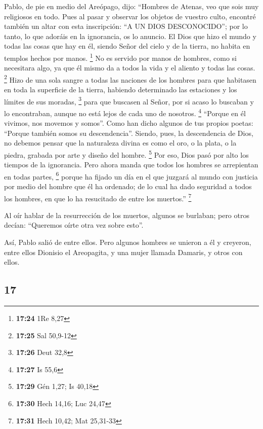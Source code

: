 \begin{paracol}{2}
 Pablo, de pie en medio del Areópago, dijo: ``Hombres de
Atenas, veo que sois muy religiosos en todo.  Pues al
pasar y observar los objetos de vuestro culto, encontré también un altar
con esta inscripción: ``A UN DIOS DESCONOCIDO''; por lo tanto, lo que
adoráis en la ignorancia, os lo anuncio.  El Dios que
hizo el mundo y todas las cosas que hay en él, siendo Señor del cielo y
de la tierra, no habita en templos hechos por manos. \footnote{\textbf{17:24}
  1Re 8,27}  No es servido por manos de hombres, como si
necesitara algo, ya que él mismo da a todos la vida y el aliento y todas
las cosas. \footnote{\textbf{17:25} Sal 50,9-12}  Hizo de
una sola sangre a todas las naciones de los hombres para que habitasen
en toda la superficie de la tierra, habiendo determinado las estaciones
y los límites de sus moradas, \footnote{\textbf{17:26} Deut 32,8}
 para que buscasen al Señor, por si acaso lo buscaban y
lo encontraban, aunque no está lejos de cada uno de nosotros.
\footnote{\textbf{17:27} Is 55,6}  ``Porque en él
vivimos, nos movemos y somos''. Como han dicho algunos de tus propios
poetas: ``Porque también somos su descendencia''. 
Siendo, pues, la descendencia de Dios, no debemos pensar que la
naturaleza divina es como el oro, o la plata, o la piedra, grabada por
arte y diseño del hombre. \footnote{\textbf{17:29} Gén 1,27; Is 40,18}
 Por eso, Dios pasó por alto los tiempos de la
ignorancia. Pero ahora manda que todos los hombres se arrepientan en
todas partes, \footnote{\textbf{17:30} Hech 14,16; Luc 24,47}
 porque ha fijado un día en el que juzgará al mundo con
justicia por medio del hombre que él ha ordenado; de lo cual ha dado
seguridad a todos los hombres, en que lo ha resucitado de entre los
muertos.'' \footnote{\textbf{17:31} Hech 10,42; Mat 25,31-33}

 Al oír hablar de la resurrección de los muertos, algunos
se burlaban; pero otros decían: ``Queremos oírte otra vez sobre esto''.

 Así, Pablo salió de entre ellos.  Pero
algunos hombres se unieron a él y creyeron, entre ellos Dionisio el
Areopagita, y una mujer llamada Damaris, y otros con ellos.

\switchcolumn
\begin{otherlanguage}{english}

\hypertarget{section-33}{%
\section{17}\label{section-33}}


\end{otherlanguage}
\end{paracol}
